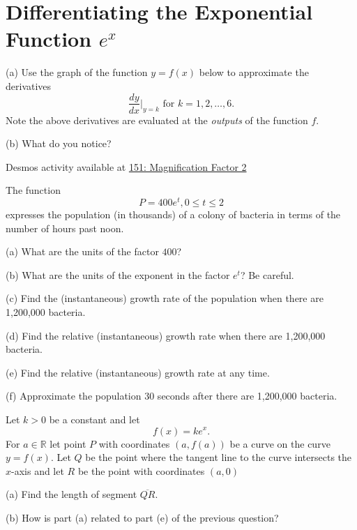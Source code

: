 \documentclass{ximera}
\begin{document}
\section*{Differentiating the Exponential Function $e^x$}

\begin{exploration}

(a) Use the graph of the function $y=f(x)$ below to approximate the derivatives 
\[
    \frac{dy}{dx}\Big|_{y=k} \text{ for } k=1, 2, \ldots , 6.
\]
Note the above derivatives are evaluated at the \emph{outputs} of the function $f$. 

(b) What do  you notice?

\begin{onlineOnly}
    \begin{center}
\end{center}
\end{onlineOnly}


Desmos activity available at \href{https://www.desmos.com/calculator/k08dphtuca}{151: Magnification Factor 2}


\end{exploration}

\begin{question}  \label{Qdefrt4trt}
The function 
\[
    P = 400 e^t , 0\leq t \leq 2
\]
expresses the population (in thousands) of a colony of bacteria in terms of the number of hours past noon.

(a) What are the units of the factor $400$?

(b) What are the units of the exponent in the factor $e^t$? Be careful.

(c) Find the (instantaneous) growth rate of the population when there are 1,200,000 bacteria.

(d) Find the relative (instantaneous) growth rate when there are 1,200,000 bacteria.

(e) Find the  relative (instantaneous) growth rate at any time.

(f) Approximate the population $30$ seconds after there are 1,200,000 bacteria.
\end{question}


\begin{question}  \label{Qdfdsf4thn}
Let $k>0$ be a constant and let
\[
     f(x) = k e^x .
\]
For $a\in \mathbb{R}$ let point $P$ with coordinates $(a, f(a))$ be a curve on the curve$y=f(x)$. Let $Q$ be the point where the tangent line to the curve intersects the $x$-axis and let $R$ be the point with coordinates $(a,0)$

(a) Find the length of segment $\overline{QR}$.

(b) How is part (a) related to part (e) of the previous question?

\end{question}
\end{document}
